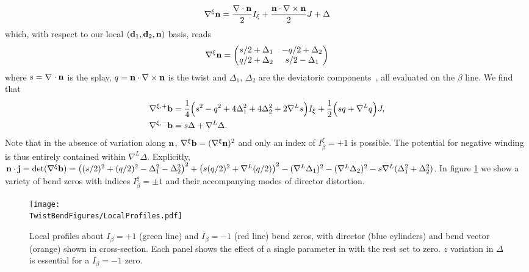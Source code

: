 {\begin{align}
    \nabla^\xi {\bf n}= \frac{\nabla \cdot {\bf n}}{2}I_\xi + \frac{{\bf n} \cdot \nabla \times {\bf n}}{2} J + \Delta
\end{align} 
which, with respect to our local $(\mathbf{d}_1,\mathbf{d}_2,\mathbf{n})$ basis, reads 
\begin{align}
 \nabla^\xi {\bf n}=\begin{pmatrix} s/2 + \Delta_1 & -q/2 + \Delta_2 \\ q/2 + \Delta_2 & s/2 - \Delta_1 \end{pmatrix}
\end{align} 
where $s = \nabla \cdot \mathbf{n}$ is the splay, $q = \mathbf{n} \cdot \nabla \times \mathbf{n}$ is the twist and $\Delta_1$, $\Delta_2$ are the deviatoric components~\citep{Machon2016b,AlexanderBook,Selinger2019}, all evaluated on the $\beta$ line. We find that
\begin{align}
\nabla^{\xi,+} \mathbf{b} &=
\frac{1}{4}\Big(s^2 - q^2 + 4\Delta_1^2 + 4\Delta_2^2 +2\nabla^L s\Big)I_\xi+
\frac{1}{2} \Big(sq + \nabla^L q \Big)J,  \\
\nabla^{\xi,-} \mathbf{b} &= s \Delta +\nabla^L \Delta.
\end{align}
 Note that in the absence of variation along $\mathbf{n}$, $\nabla^\xi \mathbf{b} = (\nabla^\xi{\bf n})^2$ and only an index of $I^\xi_\beta = +1$ is possible. The potential for negative winding is thus entirely contained within $\nabla^L \Delta$. Explicitly, $\mathbf{n} \cdot \mathbf{j} = \mathrm{det}(\nabla^\xi \mathbf{b}) = \left( (s/2)^2 +(q/2)^2 -\Delta_1^2 - \Delta_2^2\right)^2 +\left(s(q/2)^2 + \nabla^L (q/2)\right)^2 - (\nabla^L \Delta_1) ^2 - (\nabla^L \Delta_2)^2 - s \nabla^L(\Delta_1^2 + \Delta_2^2)$.  In figure \ref{fig:LocalProfiles} we show a variety of bend zeros with indices $I^\xi_\beta = \pm 1$ and their accompanying modes of director distortion.

\begin{figure}[htbp]
    \centering
    \texttt{[image: \\TwistBendFigures/LocalProfiles.pdf]}
    \caption{Local profiles about $I_\beta = +1$ (green line) and $I_\beta = -1$ (red line) bend zeros, with director (blue cylinders) and bend vector (orange) shown in cross-section. Each panel shows the effect of a single parameter in  with the rest set to zero. $z$ variation in $\Delta$ is essential for a $I_\beta = -1$ zero.}
    \label{fig:LocalProfiles}
\end{figure}


\begin{comment}








\end{comment}}
